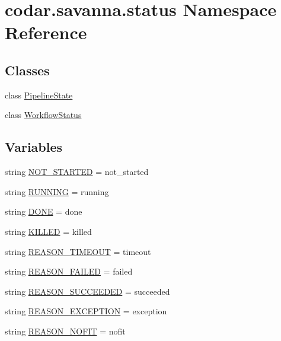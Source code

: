 \hypertarget{namespacecodar_1_1savanna_1_1status}{}\section{codar.\+savanna.\+status Namespace Reference}
\label{namespacecodar_1_1savanna_1_1status}
\subsection*{Classes}
\begin{DoxyCompactItemize}
\item 
class \hyperlink{classcodar_1_1savanna_1_1status_1_1_pipeline_state}{Pipeline\+State}
\item 
class \hyperlink{classcodar_1_1savanna_1_1status_1_1_workflow_status}{Workflow\+Status}
\end{DoxyCompactItemize}
\subsection*{Variables}
\begin{DoxyCompactItemize}
\item 
string \hyperlink{namespacecodar_1_1savanna_1_1status_aa4522e2cf19460b7517dbdb19568fbf0}{N\+O\+T\+\_\+\+S\+T\+A\+R\+T\+ED} = \textquotesingle{}not\+\_\+started\textquotesingle{}
\item 
string \hyperlink{namespacecodar_1_1savanna_1_1status_ad7ccda5533ae3cb311396ebb9cd64bd1}{R\+U\+N\+N\+I\+NG} = \textquotesingle{}running\textquotesingle{}
\item 
string \hyperlink{namespacecodar_1_1savanna_1_1status_a9a1b345dbe99c209b1418a3f308681ae}{D\+O\+NE} = \textquotesingle{}done\textquotesingle{}
\item 
string \hyperlink{namespacecodar_1_1savanna_1_1status_abcf9c4af3cc2cbc09d14fb564bb0245a}{K\+I\+L\+L\+ED} = \textquotesingle{}killed\textquotesingle{}
\item 
string \hyperlink{namespacecodar_1_1savanna_1_1status_aa0bb0febd185a721cf123fd2d1c3b4d9}{R\+E\+A\+S\+O\+N\+\_\+\+T\+I\+M\+E\+O\+UT} = \textquotesingle{}timeout\textquotesingle{}
\item 
string \hyperlink{namespacecodar_1_1savanna_1_1status_ab0ffd438e5ed72d21826960e5b826d80}{R\+E\+A\+S\+O\+N\+\_\+\+F\+A\+I\+L\+ED} = \textquotesingle{}failed\textquotesingle{}
\item 
string \hyperlink{namespacecodar_1_1savanna_1_1status_a0f7420e1be47c3bc60b07f00980e7081}{R\+E\+A\+S\+O\+N\+\_\+\+S\+U\+C\+C\+E\+E\+D\+ED} = \textquotesingle{}succeeded\textquotesingle{}
\item 
string \hyperlink{namespacecodar_1_1savanna_1_1status_a7c8ef2fede28de1fd3fce1b098deca74}{R\+E\+A\+S\+O\+N\+\_\+\+E\+X\+C\+E\+P\+T\+I\+ON} = \textquotesingle{}exception\textquotesingle{}
\item 
string \hyperlink{namespacecodar_1_1savanna_1_1status_a0a4ce01e1307aeaba51d5e4267704177}{R\+E\+A\+S\+O\+N\+\_\+\+N\+O\+F\+IT} = \textquotesingle{}nofit\textquotesingle{}
\end{DoxyCompactItemize}


